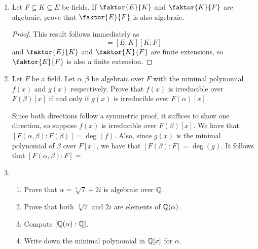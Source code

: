 \documentclass[answers]{exam}
\newcommand{\quotient}[2]{\faktor{#1}{#2}}
\begin{document}
\begin{enumerate}
\item Let $F \subseteq K \subseteq E$ be fields. If $\quotient{E}{K}$ and
$\quotient{K}{F}$ are algebraic, prove that $\quotient{E}{F}$ is also algebraic.
\begin{solution}
\begin{proof}
This result follows immediately as
\begin{equation*}
[E:F] = [E:K][K:F]
\end{equation*}
and $\quotient{E}{K}$ and $\quotient{K}{F}$ are finite extensions, so
$\quotient{E}{F}$ is also a finite extension.
\end{proof}
\end{solution}

\item Let $F$ be a field. Let $\alpha, \beta$ be algebraic over $F$ with the
minimal polynomial $f(x)$ and $g(x)$ respectively. Prove that $f(x)$ is
irreducible over $F(\beta)[x]$ if and only if $g(x)$ is irreducible over
$F(\alpha)[x]$.

\begin{solution}
Since both directions follow a symmetric proof, it suffices to show one
direction, so suppose $f(x)$ is irreducible over $F(\beta)[x]$.
We have that $[F(\alpha,\beta) : F(\beta)] = \deg(f)$. Also, since $g(x)$ is the
minimal polynomial of $\beta$ over $F[x]$, we have that $[F(\beta) : F] =
\deg(g)$. It follows that $[F(\alpha, \beta):F] = $
\end{solution}

\item
\begin{enumerate}
\item Prove that $\alpha = \sqrt[3] 7 + 2i$ is algebraic over $\mathbb{Q}$.
\begin{solution}

\end{solution}

\item Prove that both $\sqrt[3] 7$ and $2i$ are elements of $\mathbb{Q}(\alpha)$.
\begin{solution}

\end{solution}

\item Compute $[\mathbb{Q}(\alpha): \mathbb{Q}]$.
\begin{solution}

\end{solution}

\item Write down the minimal polynomial in $\mathbb{Q}[x]$ for $\alpha$.
\begin{solution}


\end{solution}
\end{enumerate}
\end{enumerate}
\end{document}
